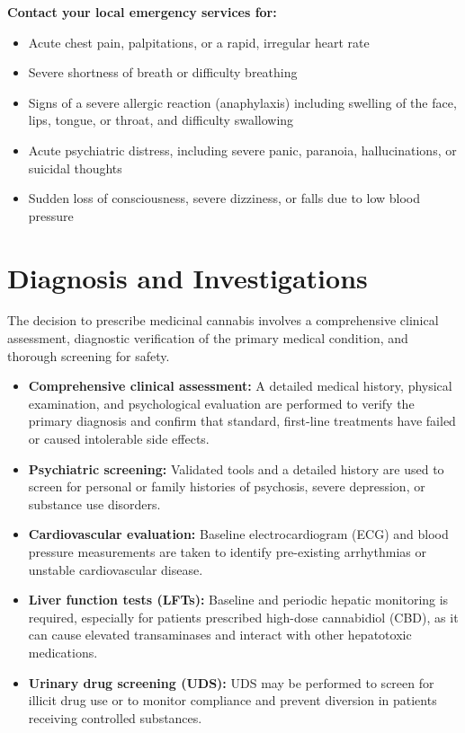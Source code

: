 \textbf{Contact your local emergency services for:}
\begin{itemize}
    \item Acute chest pain, palpitations, or a rapid, irregular heart rate
    \item Severe shortness of breath or difficulty breathing
    \item Signs of a severe allergic reaction (anaphylaxis) including swelling of the face, lips, tongue, or throat, and difficulty swallowing
    \item Acute psychiatric distress, including severe panic, paranoia, hallucinations, or suicidal thoughts
    \item Sudden loss of consciousness, severe dizziness, or falls due to low blood pressure
\end{itemize}

\section*{Diagnosis and Investigations}
The decision to prescribe medicinal cannabis involves a comprehensive clinical assessment, diagnostic verification of the primary medical condition, and thorough screening for safety.
\begin{itemize}
    \item \textbf{Comprehensive clinical assessment:} A detailed medical history, physical examination, and psychological evaluation are performed to verify the primary diagnosis and confirm that standard, first-line treatments have failed or caused intolerable side effects.
    \item \textbf{Psychiatric screening:} Validated tools and a detailed history are used to screen for personal or family histories of psychosis, severe depression, or substance use disorders.
    \item \textbf{Cardiovascular evaluation:} Baseline electrocardiogram (ECG) and blood pressure measurements are taken to identify pre-existing arrhythmias or unstable cardiovascular disease.
    \item \textbf{Liver function tests (LFTs):} Baseline and periodic hepatic monitoring is required, especially for patients prescribed high-dose cannabidiol (CBD), as it can cause elevated transaminases and interact with other hepatotoxic medications.
    \item \textbf{Urinary drug screening (UDS):} UDS may be performed to screen for illicit drug use or to monitor compliance and prevent diversion in patients receiving controlled substances.
\end{itemize}

